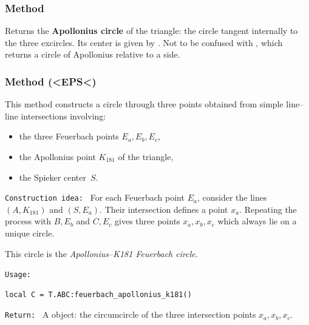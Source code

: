 \subsubsection{Method }
\label{ssub:method_triangle_the_apollonius_circle}

Returns the \textbf{Apollonius circle} of the triangle: the circle tangent
internally to the three excircles. Its center is given by
.
Not to be confused with , which
returns a circle of Apollonius relative to a side.

\begin{tkzexample}
\end{tkzexample}

\subsubsection{Method (<EPS<)}
\label{ssub:feuerbach_apollonius_k181}

This method constructs a circle through three points obtained from simple
line--line intersections involving:

\begin{itemize}
  \item the three Feuerbach points $E_a,E_b,E_c$,
  \item the Apollonius point $K_{181}$ of the triangle,
  \item the Spieker center~$S$.
\end{itemize}

\texttt{Construction idea: }
For each Feuerbach point $E_a$, consider the lines
$(A,K_{181})$ and $(S,E_a)$.
Their intersection defines a point $x_a$.
Repeating the process with $B,E_b$ and $C,E_c$ gives three points
$x_a,x_b,x_c$ which always lie on a unique circle.

This circle is the \emph{Apollonius--K181 Feuerbach circle}.

\texttt{Usage: }

\begin{verbatim}
local C = T.ABC:feuerbach_apollonius_k181()
\end{verbatim}

\texttt{Return: }
A  object: the circumcircle of the three intersection points
$x_a,x_b,x_c$.



